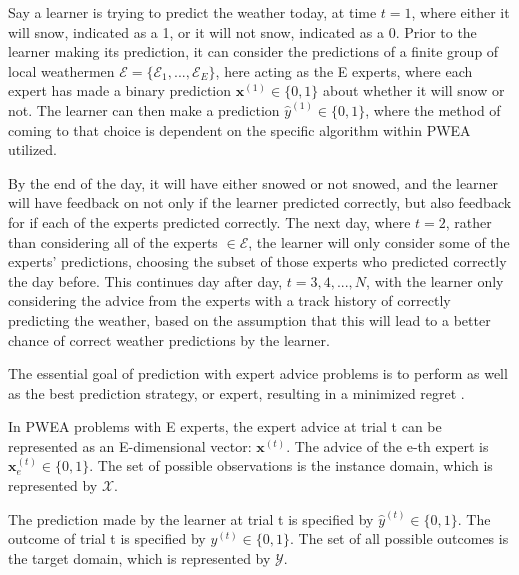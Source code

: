 \documentclass[11pt]{article}
\begin{document}
\begin{addmargin}[2em]{2em}%
Say a learner is trying to predict the weather today, at time ${t = 1}$, where either it will snow, indicated as a 1, or it will not snow, indicated as a 0. Prior to the learner making its prediction, it can consider the predictions of a finite group of local weathermen $\mathcal{E} = \{\mathcal{E}_1, ..., \mathcal{E}_E \}$, here acting as the E experts, where each expert has made a binary prediction $ \textbf{x}^{(1)} \in \{0, 1\}$ about whether it will snow or not. The learner can then make a prediction $ {\hat{y}^{(1)}} \in \{0, 1\}$, where the method of coming to that choice is dependent on the specific algorithm within PWEA utilized. 

By the end of the day, it will have either snowed or not snowed, and the learner will have feedback on not only if the learner predicted correctly, but also feedback for if each of the experts predicted correctly. The next day, where ${t = 2}$, rather than considering all of the experts $ \in \mathcal{E} $, the learner will only consider some of the experts' predictions, choosing the subset of those experts who predicted correctly the day before. This continues day after day, ${t = 3, 4, ..., N}$, with the learner only considering the advice from the experts with a track history of correctly predicting the weather, based on the assumption that this will lead to a better chance of correct weather predictions by the learner.
\end{addmargin}

The essential goal of prediction with expert advice problems is to perform as well as the best prediction strategy, or expert, resulting in a minimized regret \cite{ol_lecture}. 


\normalfont 

In PWEA problems with E experts, the expert advice at trial t can be represented as an E-dimensional vector: $\textbf{x}^{(t)}$. The advice of the e-th expert is $\textbf{x}^{(t)}_e \in \{0, 1\}$. The set of possible observations is the instance domain, which is represented by $\mathcal{X}$. 

The prediction made by the learner at trial t is specified by $\hat{y}^{(t)} \in \{0, 1\}$. The outcome of trial t is specified by $y^{(t)} \in \{0, 1\}$. The set of all possible outcomes is the target domain, which is represented by $\mathcal{Y}$.
\end{document}
